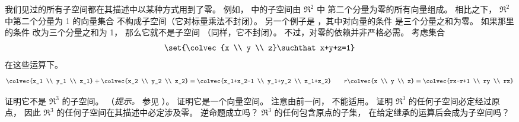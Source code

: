   \item 
    我们见过的所有子空间都在其描述中以某种方式用到了零。
    例如， 中的子空间由 $\Re^2$ 中
    第二个分量为零的所有向量组成。
    相比之下，
    $\Re^2$ 中第二个分量为 1 的向量集合
    不构成子空间（它对标量乘法不封闭）。
    另一个例子是 ，其中对向量的条件
    是三个分量之和为零。
    如果那里的条件
    改为三个分量之和为 1，
    那么它就不是子空间
    （同样，它不封闭）。
    不过，对零的依赖并非严格必需。
    考虑集合
    \begin{equation*}
       \set{\colvec{x \\ y \\ z}\suchthat x+y+z=1}
    \end{equation*}
    在这些运算下。
    \begin{equation*}
       \colvec{x_1 \\ y_1 \\ z_1}+\colvec{x_2 \\ y_2 \\ z_2}
       =\colvec{x_1+x_2-1 \\ y_1+y_2 \\ z_1+z_2}
       \qquad
       r\colvec{x \\ y \\ z}=\colvec{rx-r+1 \\ ry \\ rz}
    \end{equation*}
    \begin{exparts}
      \partsitem 证明它不是 $\Re^3$ 的子空间。
         （\textit{提示。}   参见 ）。
      \partsitem 证明它是一个向量空间。         
         注意由前一问，
          不能适用。  
      \partsitem 证明 $\Re^3$ 的任何子空间必定经过原点，
         因此 $\Re^3$ 的任何子空间在其描述中必定涉及零。
         逆命题成立吗？  
          $\Re^3$ 的任何包含原点的子集，
          在给定继承的运算后会成为子空间吗？
    \end{exparts}
